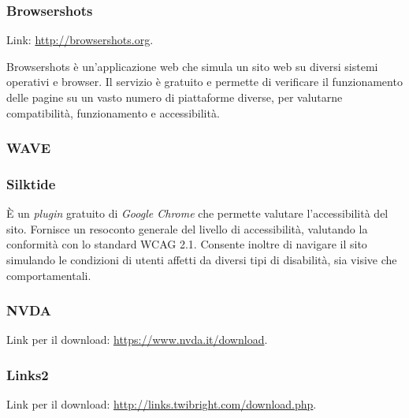 \subsubsection{Browsershots}
\label{test-strumenti-browsershots}
Link: \url{http://browsershots.org}. 

Browsershots è un'applicazione web che simula un sito web su diversi sistemi operativi e browser. Il servizio è gratuito e permette di verificare il funzionamento delle pagine su un vasto numero di piattaforme diverse, per valutarne compatibilità, funzionamento e accessibilità.

\subsubsection{WAVE}
\label{test-strumenti-wave}


\subsubsection{Silktide}
\label{test-strumenti-silktide}
È un \textit{plugin} gratuito di \textit{Google Chrome} che permette valutare l'accessibilità del sito. Fornisce un resoconto generale del livello di accessibilità, valutando la conformità con lo standard WCAG 2.1. Consente inoltre di navigare il sito simulando le condizioni di utenti affetti da diversi tipi di disabilità, sia visive che comportamentali. 


\subsubsection{NVDA}
\label{test-strumenti-nvda}
Link per il download: \url{https://www.nvda.it/download}.




\subsubsection{Links2}
\label{test-strumenti-links2}
Link per il download: \url{http://links.twibright.com/download.php}.

